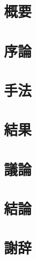 \documentclass[a4paper,uplatex,12pt,dvipdfmx,onecolumn]{jsreport}
\begin{document}

\chapter*{概要}
\pagestyle{empty}
\thispagestyle{empty}

\newpage
\pagestyle{plain}




\setlength{\baselineskip}{2em}
\newpage
{}

\chapter{序論}
\label{Sec.Introduction}


\chapter{手法}
\label{Sec.Method.A}


\chapter{結果}
\label{Sec.Result.A}


\chapter{議論}
\label{Sec.Discussion}


\chapter{結論}
\label{Sec.Conclusion}


\chapter*{謝辞}



\newpage

\appendix
\end{document}
